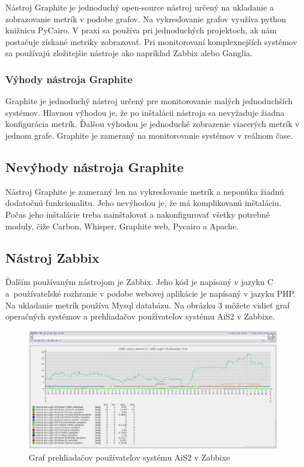 \documentclass[a4paper, usesections, upjsfrontpage, thesismargins, thesislinespacing]{rnthesis}
\begin{document}
Nástroj Graphite je jednoduchý open-source nástroj určený na ukladanie a zobrazovanie metrík v podobe grafov.
Na vykresľovanie grafov využíva python knižnicu PyCairo.
V praxi sa používa pri jednoduchých projektoch, ak nám postačuje získané metriky zobrazovať.
Pri monitorovaní komplexnejších systémov sa používajú zložitejšie nástroje ako napríklad Zabbix alebo Ganglia.

\subsubsection{Výhody nástroja Graphite}

Graphite je jednoduchý nástroj určený pre monitorovanie malých jednoduchších systémov.
Hlavnou výhodou je, že po inštalácii nástroja sa nevyžaduje žiadna konfigurácia metrík.
Ďalšou výhodou je jednoduché zobrazenie viacerých metrík v jednom grafe.
Graphite je zameraný na monitorovanie systémov v reálnom čase.

\subsection{Nevýhody nástroja Graphite}

Nástroj Graphite je zameraný len na vykresľovanie metrík a neponúka žiadnú dodatočnú funkcionalitu.
Jeho nevýhodou je, že má komplikovanú inštaláciu.
Počas jeho inštalácie treba nainštalovať a nakonfigurovať všetky potrebné moduly, čiže Carbon, Whisper, Graphite web, Pycairo a Apache.

\subsection{Nástroj Zabbix}

Ďalším používaným nástrojom je Zabbix.
Jeho kód je napísaný v jazyku C a~používateľské rozhranie v podobe webovej aplikácie je napísaný v jazyku PHP.
Na ukladanie metrík používa Mysql databázu.
Na obrázku 3 môžete vidieť graf operačných systémov a prehliadačov používateľov systému AiS2 v Zabbixe.

\begin{figure}
	\begin{center}
		\includegraphics[scale=0.41]{zabbix1.png}
	\end{center}
	\caption{Graf prehliadačov používateľov systému AiS2 v Zabbixe}
\end{figure}
\end{document}
